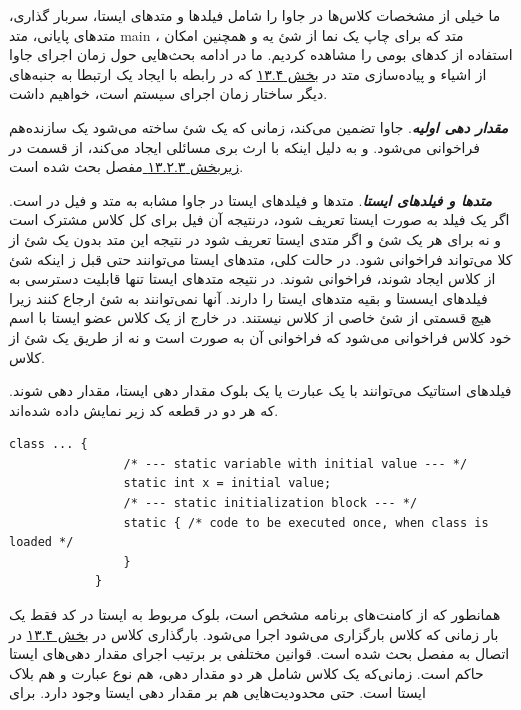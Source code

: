 \documentclass[a4paper,12pt]{report}
\newcommand{\lrm}[1]{{\color{steelBlue}\lr{\texttt{#1}}}}
\begin{document}
	ما خیلی از مشخصات کلاس‌ها در جاوا را شامل فیلد‌ها و متدهای ایستا،  سربار گذاری، متد‌های پایانی، متد main ، متد 
	 که برای چاپ یک نما از شئ یه و همچنین امکان استفاده از کد‌های بومی را مشاهده کردیم. ما در ادامه بحث‌هایی حول زمان اجرای جاوا از اشیاء و پیاده‌سازی متد 
	  در 
	\hyperref[sec4:chap13]{
	بخش ۱۳.۴} که در رابطه با ایجاد یک ارتبطا به جنبه‌های دیگر ساختار زمان اجرای سیستم است، خواهیم داشت.

	\textbf{\textit{
	مقدار دهی اولیه}}. جاوا تضمین می‌کند، زمانی که یک شئ ساخته می‌شود یک سازنده‌هم فراخوانی می‌شود.
	و به دلیل اینکه با ارث ‌بری مسائلی ایجاد می‌کند، از قسمت در 
	\hyperref[subsec3:sec2:chap13]{
	زیربخش ۱۳.۲.۳ } مفصل بحث شده است.
	
	\textit{\textbf{
	متد‌ها و فیلد‌های ایستا}}. متد‌ها و فیلد‌های ایستا در جاوا مشابه به متد و فیل در 
 است. اگر یک فیلد به صورت ایستا تعریف شود، درنتیجه آن فیل برای کل کلاس مشترک است و نه برای هر یک شئ و اگر متدی ایستا تعریف شود در نتیجه این متد بدون یک شئ از کلا می‌تواند فراخوانی شود. در حالت کلی، متد‌های ایستا می‌توانند حتی قبل ز اینکه  شئ از کلاس ایجاد شوند، فراخوانی شوند. در نتیجه متد‌های ایستا تنها قابلیت دسترسی به فیلد‌های ایسستا و بقیه متد‌های ایستا را دارند. آنها نمی‌توانند به شئ 
 ارجاع کنند زیرا هیچ قسمتی از شئ خاصی از کلاس نیستند. در خارج از یک کلاس عضو ایستا با اسم خود کلاس فراخوانی می‌شود که فراخوانی آن به صورت 
	\lrm{class\_name.static\_method(args)}
	است و نه از طریق یک شئ از کلاس.
	
	فیلد‌های استاتیک می‌توانند با یک عبارت یا یک بلوک مقدار ‌دهی ایستا، مقدار دهی شوند. که هر دو در قطعه کد زیر نمایش داده شده‌اند.
	
	\begin{latin}
		\small
		\begin{lstlisting}[]
			class ... {
				/* --- static variable with initial value --- */
				static int x = initial value;
				/* --- static initialization block --- */
				static { /* code to be executed once, when class is loaded */
				}
			}
		\end{lstlisting}
	\end{latin}	
	
	همانطور که از کامنت‌های برنامه مشخص است، بلوک مربوط به ایستا در کد فقط یک بار زمانی که کلاس بارگزاری می‌شود اجرا می‌شود. بارگذاری کلاس در 
	\hyperref[sec4:chap13]{
		بخش ۱۳.۴} در اتصال به 
 مفصل بحث شده است. قوانین مختلفی بر برتیب اجرای مقدار دهی‌های ایستا حاکم است. زمانی‌که یک کلاس شامل هر دو مقدار دهی، هم نوع عبارت و هم بلاک ایستا است. حتی محدودیت‌هایی هم بر مقدار دهی ایستا وجود دارد. برای     
	
\end{document}
